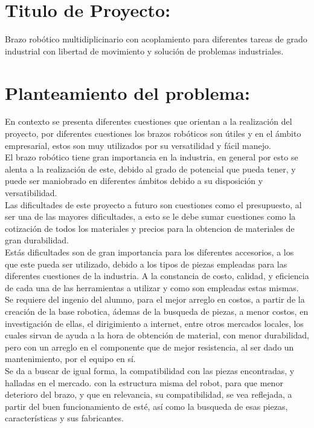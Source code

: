 \documentclass[14pt,a4paper]{article}
\begin{document}
\newpage

\section{Titulo de Proyecto:}

Brazo robótico multidiplicinario con acoplamiento para diferentes tareas de grado industrial con libertad de movimiento y solución de problemas industriales.


\section{Planteamiento del problema:}

En contexto se presenta diferentes cuestiones que orientan a la realización del proyecto, por diferentes cuestiones los brazos robóticos son útiles y en el ámbito empresarial, estos son muy utilizados por su versatilidad y fácil manejo.\\
El brazo robótico tiene gran importancia en la industria, en general por esto se alenta a la realización de este, debido al grado de potencial que pueda tener, y puede ser maniobrado en diferentes ámbitos debido a su disposición y versatibilidad.\\
Las dificultades de este proyecto a futuro son cuestiones como el presupuesto, al ser una de las mayores dificultades, a esto se le debe sumar cuestiones como la cotización de todos los materiales y precios para la obtencion de materiales de gran durabilidad.\\
Estás dificultades son de gran importancia para los diferentes accesorios, a los que este pueda ser utilizado,  debido a los tipos de piezas empleadas para las diferentes cuestiones de la industria. A la constancia de costo, calidad, y eficiencia de cada una de las herramientas a utilizar y como son empleadas estas mismas.
Se requiere del ingenio del alumno, para el mejor arreglo en costos, a partir de la creación de la base robotica, ádemas de la busqueda de piezas, a menor costos, en investigación de ellas, el dirigimiento a internet, entre otros mercados locales, los cuales sirvan de ayuda a la hora de obtención de material, con menor durabilidad, pero con un arreglo en el componente que de mejor resistencia, al ser dado un mantenimiento, por el equipo en sí.\\
Se da a buscar de igual forma, la compatibilidad con las piezas encontradas, y halladas en el mercado. con la estructura misma del robot, para que menor deterioro del brazo, y que en relevancia, su compatibilidad, se vea reflejada, a partir del buen funcionamiento de esté, así como la busqueda de esas piezas, características y sus fabricantes.\\
\end{document}
